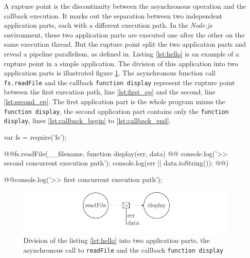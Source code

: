 A rupture point is the discontinuity between the asynchronous operation and the callback execution.
It marks out the separation between two independent application parts, each with a different execution path.
In the \textit{Node.js} environment, these two application parts are executed one after the other on the same execution thread.
But the rupture point split the two application parts and reveal a pipeline parallelism, as defined in\cite{Gordon2006}.
Listing \ref{lst:hello} is an example of a rupture point in a simple application.
The division of this application into two application parts is illustrated figure \ref{fig:flux-1}.
The asynchronous function call \texttt{fs.readFile} and the callback \texttt{function display} represent the rupture point between the first execution path, line \ref{lst:first_ep} and the second, line \ref{lst:second_ep}.
The first application part is the whole program minus the \texttt{function display}, the second application part contains only the \texttt{function display}, lines \ref{lst:callback_begin} to \ref{lst:callback_end}.

\begin{code}[js, caption={Example of a rupture point : an asynchronous function call, \texttt{fs.readFile()}, with a callback parameter, \texttt{function display}},label={lst:hello}]
var fs = require('fs');

@\label{lst:callback_begin}@fs.readFile(__filename, function display(err, data) {
@\label{lst:second_ep}@  console.log('>> second concurrent execution path');
  console.log(err || data.toString());
@\label{lst:callback_end}@})

@\label{lst:first_ep}@console.log('>> first concurrent execution path');
\end{code}

\begin{figure}[h!]
\begin{center}
  \includegraphics[width=\linewidth]{ressources/flux-1.pdf}
  \caption{Division of the listing \ref{lst:hello} into two application parts, the asynchronous call to \texttt{readFile} and the callback \texttt{function display}}
  \label{fig:flux-1}
\end{center}
\end{figure}

